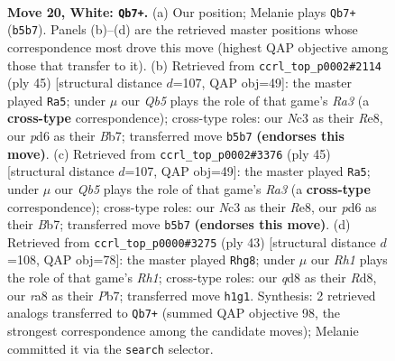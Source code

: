 \documentclass[11pt]{article}
\begin{document}
\clearpage

\begin{figure}[p]\centering
\begin{subfigure}{0.46\textwidth}\centering
\resizebox{\linewidth}{!}{%
\newchessgame
\chessboard[
  setfen={rn1q1br1/4kp2/3p1np1/1QpP4/4PB2/1PN4N/P2K4/5R1R w - - 3 20},
  showmover=false,
  pgfstyle=straightmove, color=movearrow, markmove={b5-b7}
]}
\caption{}
\end{subfigure}\hfill
\begin{subfigure}{0.46\textwidth}\centering
\resizebox{\linewidth}{!}{%
\newchessgame
\chessboard[
  setfen={1q2r1k1/1b3pp1/r4n1p/3p4/2p5/P1N1P1P1/1Q3PBP/2RR2K1 b - - 1 23},
  showmover=false,
  pgfstyle=straightmove, color=movearrow, markmove={a6-a5}
]}
\caption{}
\end{subfigure}
\\[4pt]
\begin{subfigure}{0.46\textwidth}\centering
\resizebox{\linewidth}{!}{%
\newchessgame
\chessboard[
  setfen={1q2r1k1/1b3pp1/r4n1p/3p4/2p5/P1N1P1P1/1Q3PBP/2RR2K1 b - - 1 23},
  showmover=false,
  pgfstyle=straightmove, color=movearrow, markmove={a6-a5}
]}
\caption{}
\end{subfigure}\hfill
\begin{subfigure}{0.46\textwidth}\centering
\resizebox{\linewidth}{!}{%
\newchessgame
\chessboard[
  setfen={1k1r3r/1p2q1pp/2n2p2/p2b3N/5P1P/2Q1P3/1P1RBKP1/R7 b - - 5 22},
  showmover=false,
  pgfstyle=straightmove, color=movearrow, markmove={h8-g8}
]}
\caption{}
\end{subfigure}
\caption{\textbf{Move 20, White: \texttt{Qb7+}.} (a) Our position; Melanie plays \texttt{Qb7+} (\texttt{b5b7}). Panels (b)--(d) are the retrieved master positions whose correspondence most drove this move (highest QAP objective among those that transfer to it). (b) Retrieved from \texttt{ccrl\_top\_p0002\#2114} (ply 45) [structural distance $d$=107, QAP obj=49]: the master played \texttt{Ra5}; under $\mu$ our \emph{Qb5} plays the role of that game's \emph{Ra3} (a \textbf{cross-type} correspondence); cross-type roles: our \emph{N}c3 as their \emph{R}e8, our \emph{p}d6 as their \emph{B}b7; transferred move \texttt{b5b7} \textbf{(endorses this move)}. (c) Retrieved from \texttt{ccrl\_top\_p0002\#3376} (ply 45) [structural distance $d$=107, QAP obj=49]: the master played \texttt{Ra5}; under $\mu$ our \emph{Qb5} plays the role of that game's \emph{Ra3} (a \textbf{cross-type} correspondence); cross-type roles: our \emph{N}c3 as their \emph{R}e8, our \emph{p}d6 as their \emph{B}b7; transferred move \texttt{b5b7} \textbf{(endorses this move)}. (d) Retrieved from \texttt{ccrl\_top\_p0000\#3275} (ply 43) [structural distance $d$=108, QAP obj=78]: the master played \texttt{Rhg8}; under $\mu$ our \emph{Rh1} plays the role of that game's \emph{Rh1}; cross-type roles: our \emph{q}d8 as their \emph{R}d8, our \emph{r}a8 as their \emph{P}b7; transferred move \texttt{h1g1}. Synthesis: 2 retrieved analogs transferred to \texttt{Qb7+} (summed QAP objective 98, the strongest correspondence among the candidate moves); Melanie committed it via the \texttt{search} selector.}
\label{fig:thought-m38}
\end{figure}
\end{document}
